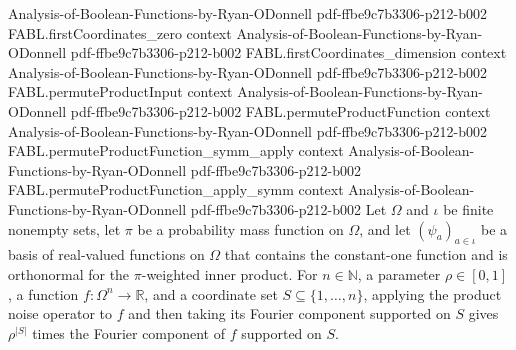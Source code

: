 \begin{theorem}
  {Analysis-of-Boolean-Functions-by-Ryan-ODonnell}
  {pdf-ffbe9c7b3306-p212-b002}
\proofstep
  {FABL.firstCoordinates_zero}
  {context}
  {Analysis-of-Boolean-Functions-by-Ryan-ODonnell}
  {pdf-ffbe9c7b3306-p212-b002}
\proofstep
  {FABL.firstCoordinates_dimension}
  {context}
  {Analysis-of-Boolean-Functions-by-Ryan-ODonnell}
  {pdf-ffbe9c7b3306-p212-b002}
\proofstep
  {FABL.permuteProductInput}
  {context}
  {Analysis-of-Boolean-Functions-by-Ryan-ODonnell}
  {pdf-ffbe9c7b3306-p212-b002}
\proofstep
  {FABL.permuteProductFunction}
  {context}
  {Analysis-of-Boolean-Functions-by-Ryan-ODonnell}
  {pdf-ffbe9c7b3306-p212-b002}
\proofstep
  {FABL.permuteProductFunction_symm_apply}
  {context}
  {Analysis-of-Boolean-Functions-by-Ryan-ODonnell}
  {pdf-ffbe9c7b3306-p212-b002}
\proofstep
  {FABL.permuteProductFunction_apply_symm}
  {context}
  {Analysis-of-Boolean-Functions-by-Ryan-ODonnell}
  {pdf-ffbe9c7b3306-p212-b002}
Let $\Omega$ and $\iota$ be finite nonempty sets, let $\pi$ be a probability mass
function on $\Omega$, and let $(\psi_a)_{a\in\iota}$ be a basis of real-valued functions
on $\Omega$ that contains the constant-one function and is orthonormal for the
$\pi$-weighted inner product. For $n\in\mathbb N$, a parameter $\rho\in[0,1]$, a
function $f:\Omega^n\to\mathbb R$, and a coordinate set $S\subseteq\{1,\ldots,n\}$,
applying the product noise operator to $f$ and then taking its Fourier component
supported on $S$ gives $\rho^{|S|}$ times the Fourier component of $f$ supported on $S$.
\end{theorem}


